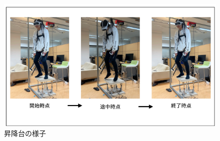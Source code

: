 \begin{figure}[htbp]
  \centering
  \includegraphics[width=1.0\linewidth]{fig/昇降台の様子.png}
  \caption{昇降台の様子}
  \label{fig:chart2}
\end{figure}









